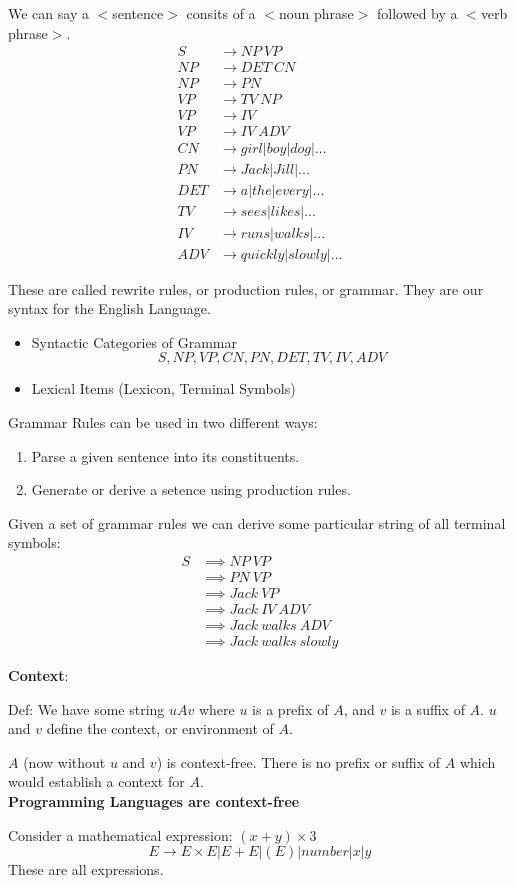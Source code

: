 \documentclass{scrartcl}
\begin{document}
We can say a $<$sentence$>$ consits of a $<$noun phrase$>$ followed by a $<$verb phrase$>$.\\
\begin{align*}
S   &\rightarrow NP\ VP\\
NP  &\rightarrow DET\ CN\\
NP  &\rightarrow PN\\
VP  &\rightarrow TV\ NP\\
VP  &\rightarrow IV\\
VP  &\rightarrow IV\ ADV\\
CN  &\rightarrow girl|boy|dog|...\\
PN  &\rightarrow Jack|Jill|...\\
DET &\rightarrow a|the|every|...\\
TV  &\rightarrow sees|likes|...\\
IV  &\rightarrow runs|walks|...\\
ADV &\rightarrow quickly|slowly|...
\end{align*}

These are called rewrite rules, or production rules, or grammar. They are our syntax for the English Language.
\begin{itemize}
\item Syntactic Categories of Grammar $$S,NP,VP,CN,PN,DET,TV,IV,ADV$$
\item Lexical Items (Lexicon, Terminal Symbols)
\end{itemize}

Grammar Rules can be used in two different ways:
\begin{enumerate}
\item Parse a given sentence into its constituents.
\item Generate or derive a setence using production rules.
\end{enumerate}

Given a set of grammar rules we can derive some particular string of all terminal symbols:
\begin{align*}
S &\implies NP\ VP\\
  &\implies PN\ VP\\
  &\implies Jack\ VP\\
  &\implies Jack\ IV\ ADV\\
  &\implies Jack\ walks\ ADV\\
  &\implies Jack\ walks\ slowly
\end{align*}

\textbf{Context}:

Def: We have some string $uAv$ where $u$ is a prefix of $A$, and $v$ is a suffix of $A$. $u$ and $v$ define the context, or environment of $A$.

$A$ (now without $u$ and $v$) is context-free. There is no prefix or suffix of $A$ which would establish a context for $A$.\\

\textbf{Programming Languages are context-free}\centering

Consider a mathematical expression: $(x+y)\times3$\\
$$E\rightarrow E\times E | E + E | (E) | number | x | y$$
These are all expressions.
\end{document}
